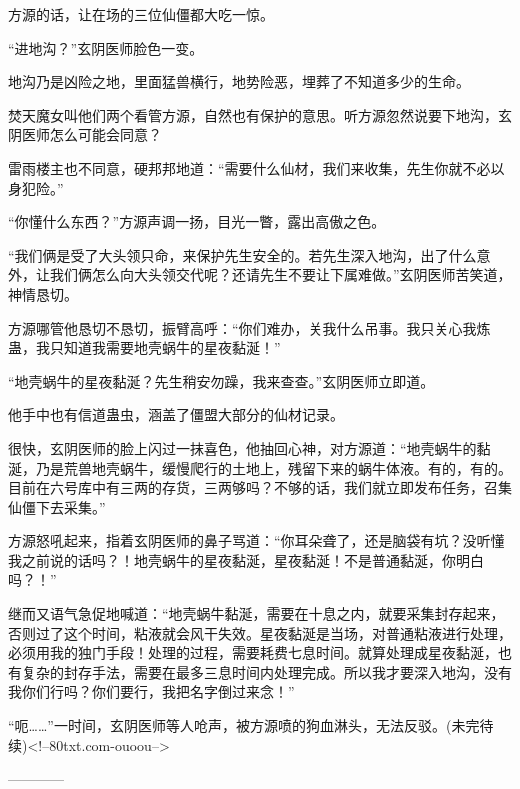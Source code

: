 \begin{this_body}
方源的话，让在场的三位仙僵都大吃一惊。

“进地沟？”玄阴医师脸色一变。

地沟乃是凶险之地，里面猛兽横行，地势险恶，埋葬了不知道多少的生命。

焚天魔女叫他们两个看管方源，自然也有保护的意思。听方源忽然说要下地沟，玄阴医师怎么可能会同意？

雷雨楼主也不同意，硬邦邦地道：“需要什么仙材，我们来收集，先生你就不必以身犯险。”

“你懂什么东西？”方源声调一扬，目光一瞥，露出高傲之色。

“我们俩是受了大头领只命，来保护先生安全的。若先生深入地沟，出了什么意外，让我们俩怎么向大头领交代呢？还请先生不要让下属难做。”玄阴医师苦笑道，神情恳切。

方源哪管他恳切不恳切，振臂高呼：“你们难办，关我什么吊事。我只关心我炼蛊，我只知道我需要地壳蜗牛的星夜黏涎！”

“地壳蜗牛的星夜黏涎？先生稍安勿躁，我来查查。”玄阴医师立即道。

他手中也有信道蛊虫，涵盖了僵盟大部分的仙材记录。

很快，玄阴医师的脸上闪过一抹喜色，他抽回心神，对方源道：“地壳蜗牛的黏涎，乃是荒兽地壳蜗牛，缓慢爬行的土地上，残留下来的蜗牛体液。有的，有的。目前在六号库中有三两的存货，三两够吗？不够的话，我们就立即发布任务，召集仙僵下去采集。”

方源怒吼起来，指着玄阴医师的鼻子骂道：“你耳朵聋了，还是脑袋有坑？没听懂我之前说的话吗？！地壳蜗牛的星夜黏涎，星夜黏涎！不是普通黏涎，你明白吗？！”

继而又语气急促地喊道：“地壳蜗牛黏涎，需要在十息之内，就要采集封存起来，否则过了这个时间，粘液就会风干失效。星夜黏涎是当场，对普通粘液进行处理，必须用我的独门手段！处理的过程，需要耗费七息时间。就算处理成星夜黏涎，也有复杂的封存手法，需要在最多三息时间内处理完成。所以我才要深入地沟，没有我你们行吗？你们要行，我把名字倒过来念！”

“呃……”一时间，玄阴医师等人呛声，被方源喷的狗血淋头，无法反驳。(未完待续)<!--80txt.com-ouoou-->

------------

\end{this_body}

